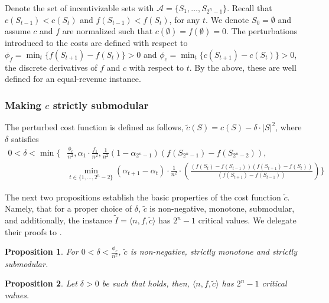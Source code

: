 \documentclass[11pt]{article}
\newtheorem{proposition}{Proposition}
\newcommand{\IS}{\mathcal{A}}
\newcommand{\inst}[3]{\langle #1, #2, #3 \rangle}
\newcommand{\tc}{\tilde{c}}
\newcommand{\tI}{\tilde{I}}
\newcommand{\InstTildeI}{\tI = \inst{n}{f}{\tc}}
\begin{document}
Denote the set of incentivizable sets with $\IS = \{S_1,\dots,S_{2^n-1}\}$. Recall that $c(S_{t-1})<c(S_t)$ and $f(S_{t-1})<f(S_t)$, for any $t$.
We denote $S_0 = \emptyset$ and assume $c$ and $f$ are normalized such that $c(\emptyset)=f(\emptyset)=0$.
The perturbations introduced to the costs are defined with respect to 
$\phi_f = \min_{t} \{f(S_{t+1})-f(S_{t})\} > 0$ and
$\phi_c = \min_{t} \{c(S_{t+1})-c(S_{t})\} > 0$, the discrete derivatives of $f$ and $c$ with respect to $t$. 
By the above, these are well defined for an equal-revenue instance.


\subsubsection{Making $c$ strictly submodular}
The perturbed cost function is defined as follows, $\tc(S)=c(S) - \delta \cdot |S|^2$, where $\delta$ satisfies
\begin{align}\label{eq:delta_for_tc}
0 < 
\delta < \min \Bigg\{ 
& \frac{\phi_c}{n^2}, \alpha_1 \cdot \frac{f_1}{n^2}, \frac{1}{n^2}(1-\alpha_{2^n-1})(f(S_{2^n-1})-f(S_{2^n-2})), \\
& \min_{t \in \{1,\dots,2^n-2\}} (\alpha_{t+1}-\alpha_t)\cdot \frac{1}{n^2} \cdot \left(\frac{(f(S_t)-f(S_{t-1}))(f(S_{t+1})-f(S_t))}{(f(S_{t+1})-f(S_{t-1}))}\right) \nonumber \bigg\}
\end{align}

The next two propositions establish the basic properties of the cost function $\tc$. Namely, that for a proper choice of $\delta$, $\tc$ is non-negative, monotone, submodular, and additionally, the instance $\InstTildeI$ has $2^n-1$ critical values.
We delegate their proofs to .

\begin{proposition}\label{prop:ctilde_basix_props}
For $0 < \delta < \frac{\phi_c}{n^2}$, $\tc$ is non-negative, strictly monotone and strictly submodular.
\end{proposition}

\begin{proposition}\label{prop:exp_many_cvs_maintained}
Let $\delta > 0$ be such that  holds, then, $\inst{n}{f}{\tc}$ has $2^n-1$ critical values.
\end{proposition}
\end{document}

